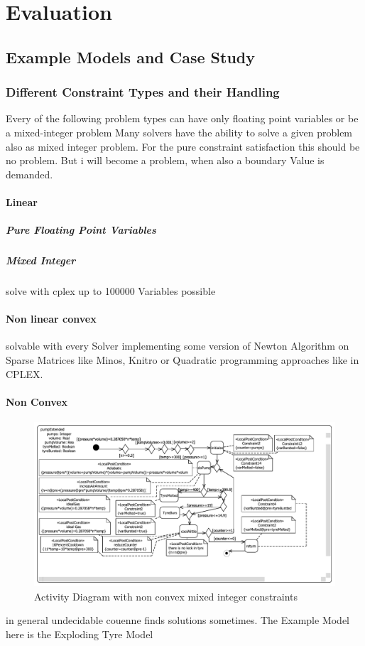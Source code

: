 \chapter{Evaluation}
\label{chap:evaluation}
\section{Example Models and Case Study}
\subsection{Different Constraint Types and their Handling}
\label{sec:evaluationAcademicModels}
Every of the following problem types can have only floating point variables or be a mixed-integer problem
Many solvers have the ability to solve a given problem also as mixed integer problem. For the pure constraint satisfaction this should be no problem. But i will become a problem, when also a boundary Value is demanded.
\subsubsection{Linear}
\paragraph{Pure Floating Point Variables}
\paragraph{Mixed Integer}
solve with cplex up to 100000 Variables possible
\subsubsection{Non linear convex}
solvable with every Solver implementing some version of Newton Algorithm on Sparse Matrices like Minos, Knitro or Quadratic programming approaches like in CPLEX.
\subsubsection{Non Convex}
\begin{figure}
\label{fig:pumpTyre}
\includegraphics[width=\textwidth]{./pics/pumpTyre.pdf}
\caption{Activity Diagram with non convex mixed integer constraints}
\end{figure}
in general undecidable couenne finds solutions sometimes.
The Example Model here is the Exploding Tyre Model

